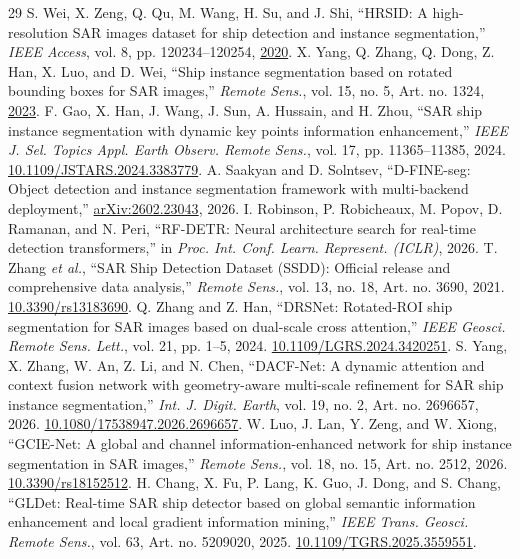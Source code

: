 \begin{thebibliography}{29}
 S. Wei, X. Zeng, Q. Qu, M. Wang, H. Su, and J. Shi, ``HRSID: A high-resolution SAR images dataset for ship detection and instance segmentation,'' \emph{IEEE Access}, vol. 8, pp. 120234--120254, \href{https://doi.org/10.1109/ACCESS.2020.3005861}{2020}.
 X. Yang, Q. Zhang, Q. Dong, Z. Han, X. Luo, and D. Wei, ``Ship instance segmentation based on rotated bounding boxes for SAR images,'' \emph{Remote Sens.}, vol. 15, no. 5, Art. no. 1324, \href{https://doi.org/10.3390/rs15051324}{2023}.
 F. Gao, X. Han, J. Wang, J. Sun, A. Hussain, and H. Zhou, ``SAR ship instance segmentation with dynamic key points information enhancement,'' \emph{IEEE J. Sel. Topics Appl. Earth Observ. Remote Sens.}, vol. 17, pp. 11365--11385, 2024. \href{https://doi.org/10.1109/JSTARS.2024.3383779}{10.1109/JSTARS.2024.3383779}.
 A. Saakyan and D. Solntsev, ``D-FINE-seg: Object detection and instance segmentation framework with multi-backend deployment,'' \href{https://arxiv.org/abs/2602.23043}{arXiv:2602.23043}, 2026.
 I. Robinson, P. Robicheaux, M. Popov, D. Ramanan, and N. Peri, ``RF-DETR: Neural architecture search for real-time detection transformers,'' in \emph{Proc. Int. Conf. Learn. Represent. (ICLR)}, 2026.
 T. Zhang \emph{et al.}, ``SAR Ship Detection Dataset (SSDD): Official release and comprehensive data analysis,'' \emph{Remote Sens.}, vol. 13, no. 18, Art. no. 3690, 2021. \href{https://doi.org/10.3390/rs13183690}{10.3390/rs13183690}.
 Q. Zhang and Z. Han, ``DRSNet: Rotated-ROI ship segmentation for SAR images based on dual-scale cross attention,'' \emph{IEEE Geosci. Remote Sens. Lett.}, vol. 21, pp. 1--5, 2024. \href{https://doi.org/10.1109/LGRS.2024.3420251}{10.1109/LGRS.2024.3420251}.
 S. Yang, X. Zhang, W. An, Z. Li, and N. Chen, ``DACF-Net: A dynamic attention and context fusion network with geometry-aware multi-scale refinement for SAR ship instance segmentation,'' \emph{Int. J. Digit. Earth}, vol. 19, no. 2, Art. no. 2696657, 2026. \href{https://doi.org/10.1080/17538947.2026.2696657}{10.1080/17538947.2026.2696657}.
 W. Luo, J. Lan, Y. Zeng, and W. Xiong, ``GCIE-Net: A global and channel information-enhanced network for ship instance segmentation in SAR images,'' \emph{Remote Sens.}, vol. 18, no. 15, Art. no. 2512, 2026. \href{https://doi.org/10.3390/rs18152512}{10.3390/rs18152512}.
 H. Chang, X. Fu, P. Lang, K. Guo, J. Dong, and S. Chang, ``GLDet: Real-time SAR ship detector based on global semantic information enhancement and local gradient information mining,'' \emph{IEEE Trans. Geosci. Remote Sens.}, vol. 63, Art. no. 5209020, 2025. \href{https://doi.org/10.1109/TGRS.2025.3559551}{10.1109/TGRS.2025.3559551}.

\end{thebibliography}
